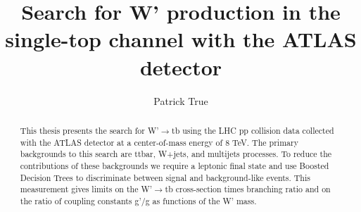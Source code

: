 \documentclass{msuphddissertation}
\author{Patrick True} %
\title{Search for W' production in the single-top channel with the ATLAS detector} %
\begin{document}
\maketitlepage %
\begin{abstract}
This thesis presents the search for W'$\rightarrow$tb using the LHC pp collision data collected with the ATLAS detector at a center-of-mass energy of 8 TeV. The primary backgrounds to this search are ttbar, W+jets, and multijets processes. To reduce the contributions of these backgrounds we require a leptonic final state and use Boosted Decision Trees to discriminate between signal and background-like events. This measurement gives limits on the W'$\rightarrow$tb cross-section times branching ratio and on the ratio of coupling constants g'/g as functions of the W' mass.



\end{abstract}



\end{document}
